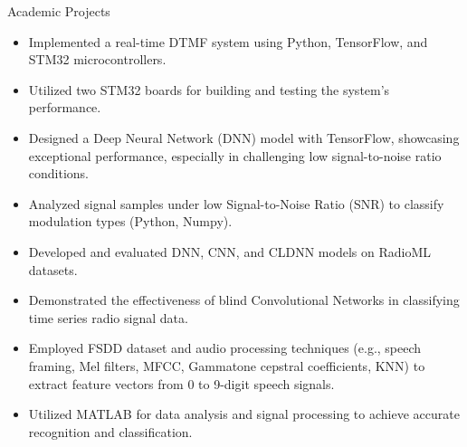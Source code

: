 \documentclass{resume} %
\begin{document}
\begin{workSection}{Academic Projects}

    \customItem[
        title=DTMF System Simulation and Implementation,
        duration=May 2023 - June 2023,
        keyHighlight=Developed an innovative approach using ANN model for DTMF signal demodulation.
    ]
    \begin{itemize}
        \itemsep -6pt
        \item Implemented a real-time DTMF system using Python, TensorFlow, and STM32 microcontrollers.
        \item Utilized two STM32 boards for building and testing the system's performance.
        \item Designed a Deep Neural Network (DNN) model with TensorFlow, showcasing exceptional performance, especially in challenging low signal-to-noise ratio conditions.
    \end{itemize}

    \customItem[
        title=Modulation Recognition using Conventional Neural Networks,
        duration=Spring 2023,
        keyHighlight=Explored modulation recognition with deep learning aapproaches.
    ]
    \begin{itemize}
        \itemsep -6pt
        \item Analyzed signal samples under low Signal-to-Noise Ratio (SNR) to classify modulation types (Python, Numpy).
        \item Developed and evaluated DNN, CNN, and CLDNN models on RadioML datasets.
        \item Demonstrated the effectiveness of blind Convolutional Networks in classifying time series radio signal data.
    \end{itemize}

    \customItem[
        title=Digital Speech Signal Analysis and Recognition,
        duration=December 2022 - January 2023,
        keyHighlight=Applied audio processing techniques for MFCC-based speech signal analysis.
    ]
    \begin{itemize}
        \itemsep -6pt
        \item Employed FSDD dataset and audio processing techniques (e.g., speech framing, Mel filters, MFCC, Gammatone cepstral coefficients, KNN) to extract feature vectors from 0 to 9-digit speech signals.
        \item Utilized MATLAB for data analysis and signal processing to achieve accurate recognition and classification.
    \end{itemize} 
  
\end{workSection}
\end{document}
